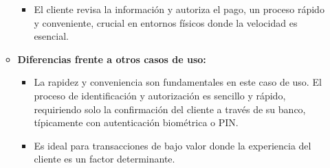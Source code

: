 \begin{enumerate}
\begin{itemize}
\begin{itemize}
            \item El cliente revisa la información y autoriza el pago, un proceso rápido y conveniente, crucial en entornos físicos donde la velocidad es esencial.
        \end{itemize}
        \item \textbf{Diferencias frente a otros casos de uso:}
        \begin{itemize}
            \item La rapidez y conveniencia son fundamentales en este caso de uso. El proceso de identificación y autorización es sencillo y rápido, requiriendo solo la confirmación del cliente a través de su banco, típicamente con autenticación biométrica o PIN.
            \item Es ideal para transacciones de bajo valor donde la experiencia del cliente es un factor determinante.
        \end{itemize}
    \end{itemize}


\end{enumerate}

